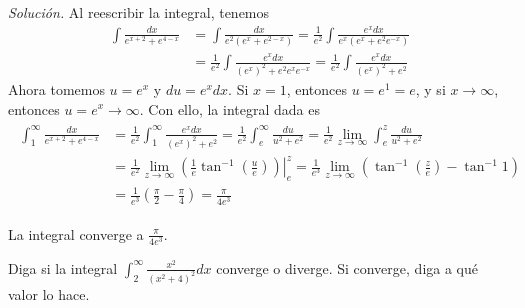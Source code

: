 \emph{Solución.} Al reescribir la integral, tenemos
\begin{align*}
  \int \frac{dx}{e^{x+2}+e^{4-x}}&=\int \frac{dx}{e^{2}\left(
  e^{x}+e^{2-x}\right) }=\frac{1}{e^{2}}\int \frac{e^{x}dx}{e^{x}\left( e^{x}+e^{2}e^{-x}\right) }
  \\
  &=\frac{1}{e^{2}}\int \frac{e^{x}dx}{\left( e^{x}\right) ^{2}+e^{2}e^{x}e^{-x}}=\frac{1}{e^{2}}\int \frac{e^{x}dx}{\left( e^{x}\right) ^{2}+e^{2}}
\end{align*}
Ahora tomemos $u=e^{x}$ y $du=e^{x}dx$. Si $x=1$, entonces $u=e^{1}=e$, y si $x\to \infty$, entonces $u=e^{x}\rightarrow \infty$. Con ello, la integral dada es
\begin{gather*}
  \begin{aligned}
    \int_{1}^{\infty }\frac{dx}{e^{x+2}+e^{4-x}}&=\frac{1}{e^{2}}\int_{1}^{\infty }\frac{e^{x}dx}{\left( e^{x}\right)^{2}+e^{2}}
    =\frac{1}{e^{2}}\int_{e}^{\infty }\frac{du}{u^{2}+e^{2}}=\frac{1}{e^{2}}\lim_{z\rightarrow \infty }\int_{e}^{z}\frac{du}{u^{2}+e^{2}} \\
    &=\frac{1}{e^{2}}\lim_{z\rightarrow \infty }\left.\left( \frac{1}{e}\tan^{-1} \left(\frac{u}{e}\right) \right)\right\vert_{e}^{z}=\frac{1}{e^{3}}\lim_{z\rightarrow \infty }\left( \tan^{-1} \left( \frac{z}{e}\right) -\tan^{-1} 1\right)\\
    &=\frac{1}{e^{3}}\left( \frac{\pi }{2}-\frac{\pi }{4}\right) =\frac{\pi }{4e^{3}}
  \end{aligned}
\end{gather*}

La integral converge a $\frac{\pi }{4e^{3}}$.

\begin{ejemplo}
  Diga si la integral $\int_{2}^{\infty }\frac{x^{2}}{\left( x^{2}+4\right) ^{2}}dx$ converge o diverge. Si converge, diga a qué valor lo hace.
\end{ejemplo}

